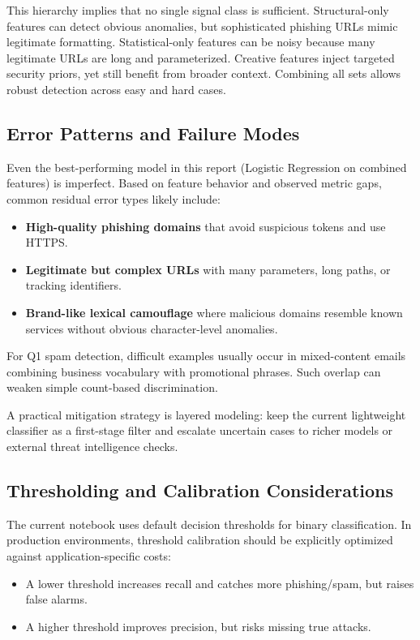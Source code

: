 This hierarchy implies that no single signal class is sufficient. Structural-only features can detect obvious anomalies, but sophisticated phishing URLs mimic legitimate formatting. Statistical-only features can be noisy because many legitimate URLs are long and parameterized. Creative features inject targeted security priors, yet still benefit from broader context. Combining all sets allows robust detection across easy and hard cases.

\subsection{Error Patterns and Failure Modes}

Even the best-performing model in this report (Logistic Regression on combined features) is imperfect. Based on feature behavior and observed metric gaps, common residual error types likely include:
\begin{itemize}
    \item \textbf{High-quality phishing domains} that avoid suspicious tokens and use HTTPS.
    \item \textbf{Legitimate but complex URLs} with many parameters, long paths, or tracking identifiers.
    \item \textbf{Brand-like lexical camouflage} where malicious domains resemble known services without obvious character-level anomalies.
\end{itemize}

For Q1 spam detection, difficult examples usually occur in mixed-content emails combining business vocabulary with promotional phrases. Such overlap can weaken simple count-based discrimination.

A practical mitigation strategy is layered modeling: keep the current lightweight classifier as a first-stage filter and escalate uncertain cases to richer models or external threat intelligence checks.

\subsection{Thresholding and Calibration Considerations}

The current notebook uses default decision thresholds for binary classification. In production environments, threshold calibration should be explicitly optimized against application-specific costs:
\begin{itemize}
    \item A lower threshold increases recall and catches more phishing/spam, but raises false alarms.
    \item A higher threshold improves precision, but risks missing true attacks.
\end{itemize}

